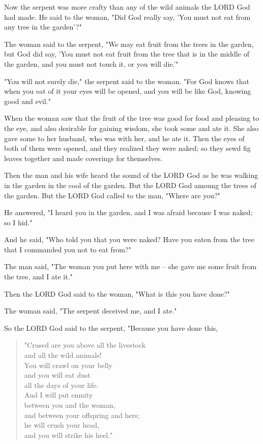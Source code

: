 \C Now the serpent was more crafty than any of the wild animals the LORD God had
made. He said to the woman, "Did God really say, 'You must not eat from any tree
in the garden'?"

\V The woman said to the serpent, "We may eat fruit from the trees in the
garden, \V but God did say, 'You must not eat fruit from the tree that is in the
middle of the garden, and you must not touch it, or you will die.'"

\V "You will not surely die," the serpent said to the woman. \V "For God knows
that when you eat of it your eyes will be opened, and you will be like God,
knowing good and evil."

\V When the woman saw that the fruit of the tree was good for food and pleasing
to the eye, and also desirable for gaining wisdom, she took some and ate it. She
also gave some to her husband, who was with her, and he ate it. \V Then the eyes
of both of them were opened, and they realized they were naked; so they sewd fig
leaves together and made coverings for themselves.

\V Then the man and his wife heard the sound of the LORD God as he was walking
in the garden in the cool of the garden. But the LORD God amoung the trees of
the garden. \V But the LORD God called to the man, "Where are you?"

\V He answered, "I heard you in the garden, and I was afraid because I was
naked; so I hid."

\V And he said, "Who told you that you were naked? Have you eaten from the tree
that I commanded you not to eat from?"

\V The man said, "The woman you put here with me -- she gave me some fruit from
the tree, and I ate it."

\V Then the LORD God said to the woman, "What is this you have done?"

The woman said, "The serpent deceived me, and I ate."

\V So the LORD God said to the serpent, "Because you have done this,

\begin{quotation}
"Crused are you above all the livestock\\
and all the wild animals!\\
You will crawl on your belly\\
and you will eat dust\\
all the days of your life.\\
\V And I will put enmity\\
between you and the woman,\\
and between your offspring and hers;\\
he will crush your head,\\
and you will strike his heel."
\end{quotation}

